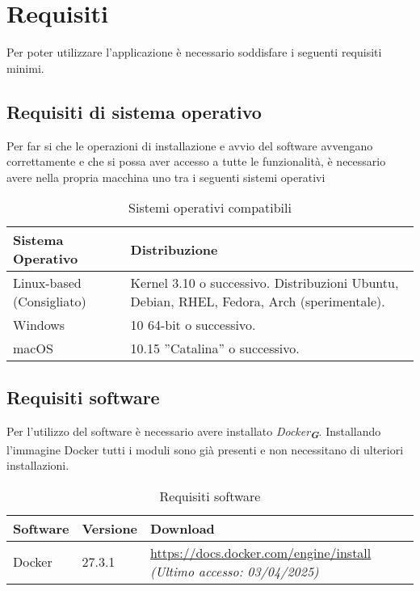
\section{Requisiti}
\label{sec:requisiti}

Per poter utilizzare l’applicazione è necessario soddisfare i seguenti requisiti minimi.


\subsection{Requisiti di sistema operativo}

Per far si che le operazioni di installazione e avvio del software avvengano correttamente e
che si possa aver accesso a tutte le funzionalità, è necessario avere nella propria macchina 
uno tra i seguenti sistemi operativi

\begin{table}[h!]
    \centering
    \renewcommand{\arraystretch}{1.6} %
    \begin{tabularx}{\textwidth}{|p{4cm}|X|} \hline
    \rowcolor[HTML]{FFD700} 
    \textbf{Sistema Operativo} & \textbf{Distribuzione} \\ 
    \hline
    Linux-based (Consigliato) & Kernel 3.10 o successivo. Distribuzioni Ubuntu, Debian, RHEL, Fedora, Arch (sperimentale). \\ 
    \hline
    Windows & 10 64-bit o successivo. \\ 
    \hline
    macOS & 10.15 ”Catalina” o successivo. \\ 
    \hline
    \end{tabularx}
    \caption{Sistemi operativi compatibili}
\end{table}


\subsection{Requisiti software}

Per l’utilizzo del software è necessario avere installato \emph{Docker}\textsubscript{\textbf{\textit{G}}}. Installando l’immagine
Docker tutti i moduli sono già presenti e non necessitano di ulteriori installazioni.

\begin{table}[h!]
    \centering
    \renewcommand{\arraystretch}{1.6} %
    \begin{tabularx}{\textwidth}{|p{1.5cm}|p{1.5cm}|X|} \hline
    \rowcolor[HTML]{FFD700}
    \textbf{Software} & \textbf{Versione} & \textbf{Download} \\ 
    \hline
    Docker & 27.3.1 & \url{https://docs.docker.com/engine/install} \emph{(Ultimo accesso: 03/04/2025)} \\ 
    \hline
    \end{tabularx}
    \caption{Requisiti software}
\end{table}


